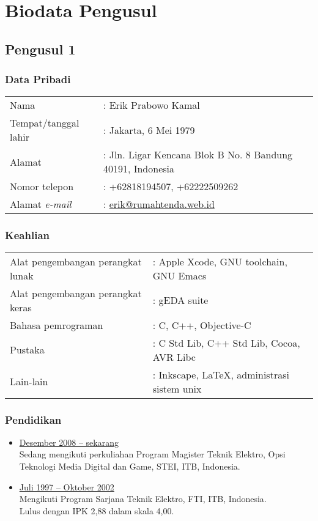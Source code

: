 \section{Biodata Pengusul}

\subsection*{Pengusul 1}

\subsubsection*{Data Pribadi}
\begin{tabular}{ll}
Nama & : Erik Prabowo Kamal\\
Tempat\slash tanggal lahir & : Jakarta, 6 Mei 1979\\
Alamat & : Jln. Ligar Kencana Blok B No. 8 Bandung 40191, Indonesia\\
Nomor telepon & : +62818194507, +62222509262\\
Alamat \textit{e-mail} & : \href{mailto:erik@rumahtenda.web.id}{erik@rumahtenda.web.id}
\end{tabular}

\subsubsection*{Keahlian}
\begin{tabular}{ll}
Alat pengembangan perangkat lunak & : Apple Xcode, GNU toolchain, GNU Emacs\\
Alat pengembangan perangkat keras & : gEDA suite\\
Bahasa pemrograman & : C, C++, Objective-C\\
Pustaka & : C Std Lib, C++ Std Lib, Cocoa, AVR Libc\\
Lain-lain & : Inkscape, \LaTeX, administrasi sistem unix
\end{tabular}

\subsubsection*{Pendidikan}
\begin{itemize}
\item \underline{Desember 2008 -- sekarang}\\
Sedang mengikuti perkuliahan Program Magister Teknik Elektro, Opsi Teknologi Media Digital dan Game, STEI, ITB, Indonesia.
\item \underline{Juli 1997 -- Oktober 2002}\\
Mengikuti Program Sarjana Teknik Elektro, FTI, ITB, Indonesia.\\
Lulus dengan IPK 2,88 dalam skala 4,00.
\end{itemize}

